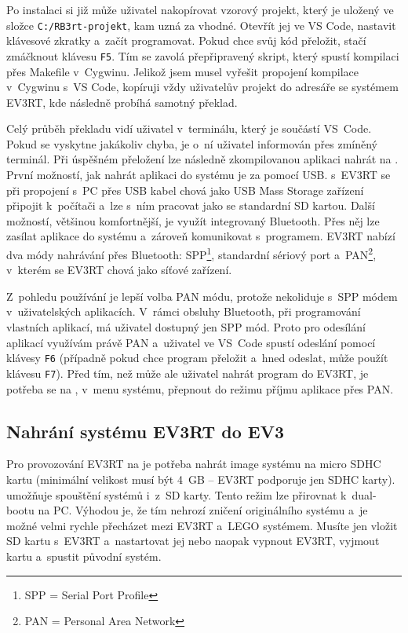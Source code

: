 Po instalaci si již může uživatel nakopírovat vzorový projekt, který je uložený ve složce \texttt{C:/RB3rt-projekt}, kam uzná za vhodné. 
Otevřít jej ve VS Code, nastavit klávesové zkratky a~začít programovat.
Pokud chce svůj kód přeložit, stačí zmáčknout klávesu \texttt{F5}. 
Tím se zavolá přepřipravený skript, který spustí kompilaci přes Makefile v~Cygwinu. 
Jelikož jsem musel vyřešit propojení kompilace v~Cygwinu s~VS Code, kopíruji vždy uživatelův projekt do adresáře se systémem EV3RT, kde následně probíhá samotný překlad.

Celý průběh překladu vidí uživatel v~terminálu, který je součástí VS~Code. 
Pokud se vyskytne jakákoliv chyba, je o~ní uživatel informován přes zmíněný terminál.
Při úspěšném přeložení lze následně zkompilovanou aplikaci nahrát na \EVbrick{}. 
První možností, jak nahrát aplikaci do systému je za pomocí USB. \brick{} s~EV3RT se při propojení s~PC přes USB kabel chová jako USB Mass Storage zařízení připojit k~počítači a~lze s~ním pracovat jako se standardní SD kartou.
Další možností, většinou komfortnější, je využít integrovaný Bluetooth. 
Přes něj lze zasílat aplikace do systému a~zároveň komunikovat s~programem. 
EV3RT nabízí dva módy nahrávání přes Bluetooth: SPP\footnote{SPP = Serial Port Profile}, standardní sériový port a~PAN\footnote{PAN = Personal Area Network}, v~kterém se EV3RT chová jako síťové zařízení.

Z~pohledu používání je lepší volba PAN módu, protože nekoliduje s~SPP módem v~uživatelských aplikacích. 
V~rámci obsluhy Bluetooth, při programování vlastních aplikací, má uživatel dostupný jen SPP mód.
Proto pro odesílání aplikací využívám právě PAN a~uživatel ve VS~Code spustí odeslání  pomocí klávesy \texttt{F6} (případně pokud chce program přeložit a~hned odeslat, může použít klávesu \texttt{F7}).
Před tím, než může ale uživatel nahrát program do EV3RT, je potřeba se na , v~menu systému, přepnout do režimu příjmu aplikace přes PAN.

\subsection{Nahrání systému EV3RT do EV3}

Pro provozování EV3RT na  je potřeba nahrát image systému na micro SDHC kartu (minimální velikost musí být 4~GB -- EV3RT podporuje jen SDHC karty).
\EVbrick{} umožňuje spouštění systémů i~z~SD karty. Tento režim lze přirovnat k~dual-bootu na PC. 
Výhodou je, že tím nehrozí zničení originálního systému a~je možné velmi rychle přecházet mezi EV3RT a~LEGO systémem. 
Musíte jen vložit SD kartu s~EV3RT a~nastartovat jej nebo naopak vypnout EV3RT, vyjmout kartu a~spustit původní systém.

